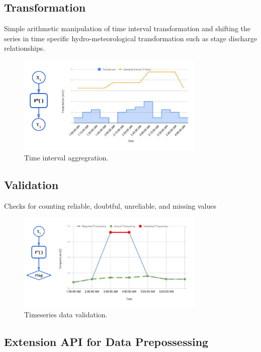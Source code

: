 \subsection{Transformation}
Simple arithmetic manipulation of time interval transformation and shifting the series in time specific hydro-meteorological transformation such as stage discharge relationships.
\begin{figure}[htp]
    \centering
    \includegraphics[width=0.8\textwidth]{method/data_preprocess/transformation.pdf}
    \caption{Time interval aggregration.}
    \label{fi:transformation}
\end{figure}

\subsection{Validation}
Checks for counting reliable, doubtful, unreliable, and missing values
\begin{figure}[htp]
    \centering
    \includegraphics[width=0.8\textwidth]{method/data_preprocess/validation.pdf}
    \caption{Timeseries data validation.}
    \label{fi:validation}
\end{figure}

\subsection{Extension API for Data Prepossessing}

